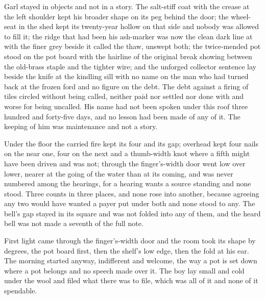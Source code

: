 Garl stayed in objects and not in a story. The salt-stiff coat with the crease at the left shoulder kept his broader shape on its peg behind the door; the wheel-seat in the shed kept its twenty-year hollow on that side and nobody was allowed to fill it; the ridge that had been his ash-marker was now the clean dark line at  with the finer grey beside it called the thaw, unswept both; the twice-mended pot stood on the pot board with the hairline of the original break showing between the old-brass staple and the tighter wire; and the unforged collector sentence lay beside the knife at the kindling sill with no name on the man who had turned back at the frozen ford and no figure on the debt. The debt against a firing of tiles circled without being called, neither paid nor settled nor done with and worse for being uncalled. His name had not been spoken under this roof three hundred and forty-five days, and no lesson had been made of any of it. The keeping of him was maintenance and not a story.

Under the floor the carried fire kept its four and its gap; overhead  kept four nails on the near one, four on the next and a thumb-width knot where a fifth might have been driven and was not; through the finger's-width door  went low over lower, nearer at the going of the water than at its coming, and was never numbered among the hearings, for a hearing wants a source standing and none stood. Three counts in three places, and none rose into another, because agreeing any two would have wanted a payer put under both and none stood to any. The bell's gap stayed in its square and was not folded into any of them, and the heard bell was not made a seventh of the full note.

First light came through the finger's-width door and the room took its shape by degrees, the pot board first, then the shelf's low edge, then the fold at his ear. The morning started anyway, indifferent and welcome, the way a pot is set down where a pot belongs and no speech made over it. The boy lay small and cold under the wool and filed what there was to file, which was all of it and none of it spendable.

